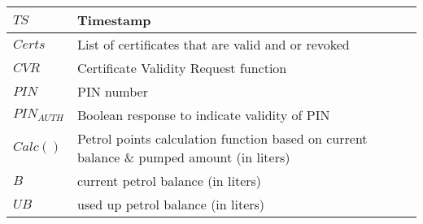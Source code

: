 \begin{center}
\begin{tabular}{| l | p{8cm} |}
            $TS$ & Timestamp \\ \hline
            $Certs$ & List of certificates that are valid and or revoked \\ \hline
            $CVR$ & Certificate Validity Request function \\ \hline
            $PIN$ & PIN number \\ \hline
            $PIN_{AUTH}$ & Boolean response to indicate validity of PIN \\ \hline
            $Calc()$ & Petrol points calculation function based on current balance \& pumped amount (in liters) \\ \hline
            $B$ & current petrol balance (in liters) \\ \hline
            $UB$ & used up petrol balance (in liters) \\ \hline
        \end{tabular}
    \end{center}